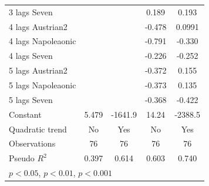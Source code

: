 \documentclass[12pt,a4paper,titlepage]{article}
\begin{document}
\begin{table}[htbp]
\begin{tabular}{l*{4}{c}}
3 lags Seven        &                     &                     &       0.189         &       0.193\sym{***}\\
4 lags Austrian2    &                     &                     &      -0.478\sym{**} &      0.0991         \\
4 lags Napoleaonic  &                     &                     &      -0.791\sym{**} &      -0.330\sym{*}  \\
4 lags Seven        &                     &                     &      -0.226\sym{*}  &      -0.252\sym{***}\\
5 lags Austrian2    &                     &                     &      -0.372\sym{*}  &       0.155         \\
5 lags Napoleaonic  &                     &                     &      -0.373         &       0.135         \\
5 lags Seven        &                     &                     &      -0.368\sym{***}&      -0.422\sym{***}\\
Constant            &       5.479         &     -1641.9\sym{***}&       14.24         &     -2388.5\sym{***}\\
Quadratic trend     &          No         &         Yes         &          No         &         Yes         \\
\hline
Observations        &          76         &          76         &          76         &          76         \\
Pseudo \(R^{2}\)    &       0.397         &       0.614         &       0.603         &       0.740         \\
\hline\hline
\multicolumn{5}{l}{\footnotesize \sym{*} \(p<0.05\), \sym{**} \(p<0.01\), \sym{***} \(p<0.001\)}\\
\end{tabular}
\end{table}
\end{document}
